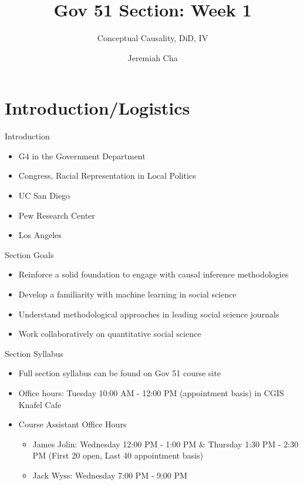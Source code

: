 \documentclass[]{beamer}
\title{Gov 51 Section: Week 1}
\subtitle{Conceptual Causality, DiD, IV}
\author[Cha]
{Jeremiah Cha}
\institute
{
Harvard University
}
\date{}
\begin{document}
\frame{\titlepage} 

\section{Introduction/Logistics}

\begin{frame}{Introduction}

\begin{itemize}
	\item G4 in the Government Department
	\item Congress, Racial Representation in Local Politics
	\item UC San Diego
	\item Pew Research Center
	\item Los Angeles
\end{itemize}

\end{frame}

\begin{frame}{Section Goals}
	\begin{itemize}
	\item Reinforce a solid foundation to engage with causal inference methodologies
	\item Develop a familiarity with machine learning in social science
	\item Understand methodological approaches in leading social science journals
	\item Work collaboratively on quantitative social science
\end{itemize}

\end{frame}

\begin{frame}{Section Syllabus}
	\begin{itemize}
		\item Full section syllabus can be found on Gov 51 course site 
		\item Office hours: Tuesday 10:00 AM - 12:00 PM (appointment basis) in CGIS Knafel Cafe
		\item Course Assistant Office Hours
		\begin{itemize}
			\item James Jolin: Wednesday 12:00 PM - 1:00 PM \& Thursday 1:30 PM - 2:30 PM (First 20 open, Last 40 appointment basis)
			\item Jack Wyss: Wednesday 7:00 PM - 9:00 PM
		\end{itemize}
	\end{itemize}
\end{frame}
\end{document}
